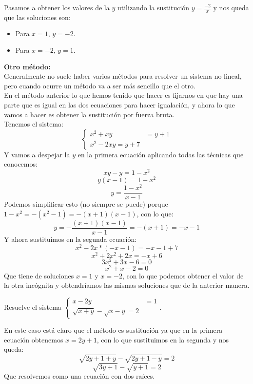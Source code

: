 \documentclass[a4paper,11pt,answers]{exam}
\begin{document}
\begin{questions}
\begin{solution}
      Pasamos a obtener los valores de la $y$ utilizando la sustitución $y = \frac{-2}{x}$ y
      nos queda que las soluciones son:
      \begin{itemize}
      \item Para $x = 1$, $y = -2$.
      \item Para $x = -2$, $y = 1$.
      \end{itemize}
      \large{\textbf{Otro método:}}\\
      Generalmente no suele haber varios métodos para resolver un sistema no lineal, pero
      cuando ocurre un método va a ser más sencillo que el otro.\\
      En el método anterior lo que hemos tenido que hacer es fijarnos en que hay una parte que
      es igual en las dos ecuaciones para hacer igualación, y ahora lo que vamos a hacer es
      obtener la sustitución por fuerza bruta.\\
      Tenemos el sistema:
      \[\begin{cases}
          x^2+xy &= y +1\\
          x^2 - 2xy = y + 7
        \end{cases}
      \]
      Y vamos a despejar la $y$ en la primera ecuación aplicando todas las técnicas que
      conocemos:
      \[xy - y = 1 - x^2\]
      \[y(x-1) = 1-x^2\]
      \[y = \frac{1-x^2}{x-1}\]
      Podemos simplificar esto (no siempre se puede) porque $1-x^2 = -(x^2 - 1) = -(x+1)(x-1)$,
      con lo que:
      \[y = -\frac{(x+1)(x-1)}{x-1} = -(x+1) = -x - 1\]
      Y ahora sustituimos en la segunda ecuación:
      \[x^2 - 2x*(-x -1) = -x-1+7\]
      \[x^2 +2x^2 + 2x = -x + 6\]
      \[3x^2 + 3x - 6 = 0\]
      \[x^2 + x - 2 = 0\]
      Que tiene de soluciones $x=1$ y $x= -2$, con lo que podemos obtener el valor de la otra
      incógnita y obtendríamos las mismas soluciones que de la anterior manera.
    \end{solution}
  \question Resuelve el sistema $
    \begin{cases}
      x-2y &= 1\\
      \sqrt{x+y} - \sqrt{x-y} = 2
    \end{cases}
    $.
    \begin{solution}
      En este caso está claro que el método es sustitución ya que en la primera ecuación obtenemos $x =2y + 1$,
      con lo que sustituimos en la segunda y nos queda:
      \[\sqrt{2y + 1 + y}- \sqrt{2y + 1 - y} = 2\]
      \[\sqrt{3y + 1} - \sqrt{y + 1} = 2\]
      Que resolvemos como una ecuación con dos raíces.

\end{solution}
\end{questions}
\end{document}
